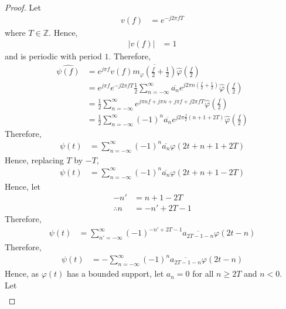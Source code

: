 \documentclass[titlepage, fleqn, a4paper, 12pt, twoside]{article}
\theoremstyle{definition}
\theoremstyle{theorem}
\begin{document}
\begin{proof}
	Let
	\begin{align*}
		v(f) &= e^{-j 2 \pi f T}
	\end{align*}
	where $T \in \mathbb{Z}$.
	Hence,
	\begin{align*}
		\left| v(f) \right| &= 1
	\end{align*}
	and is periodic with period $1$.
	Therefore,
	\begin{align*}
		\hat{\psi(f)} &= e^{j \pi f} v(f) \overline{m_{\varphi}\left( \frac{f}{2} + \frac{1}{2} \right)} \hat{\varphi}\left( \frac{f}{2} \right)\\
		&= e^{j \pi f} e^{-j 2 \pi f T} \frac{1}{2} \sum\limits_{n = -\infty}^{\infty} \overline{a_n} e^{j 2 \pi n \left( \frac{f}{2} + \frac{1}{2} \right)} \hat{\varphi}\left( \frac{f}{2} \right)\\
		&= \frac{1}{2} \sum\limits_{n = -\infty}^{\infty} e^{j \pi n f + j \pi n + j \pi f + j 2 \pi f T} \hat{\varphi}\left( \frac{f}{2} \right)\\
		&= \frac{1}{2} \sum\limits_{n = -\infty}^{\infty} (-1)^n \overline{a_n} e^{j 2 \pi \frac{f}{2} (n + 1 + 2 T)} \hat{\varphi}\left( \frac{f}{2} \right)
	\end{align*}
	Therefore,
	\begin{align*}
		\psi(t) &= \sum\limits_{n = -\infty}^{\infty} (-1)^n \overline{a_n} \varphi(2 t + n + 1 + 2 T)
	\end{align*}
	Hence, replacing $T$ by $-T$,
	\begin{align*}
		\psi(t) &= \sum\limits_{n = -\infty}^{\infty} (-1)^n \overline{a_n} \varphi(2 t + n + 1 - 2 T)
	\end{align*}
	Hence, let
	\begin{align*}
		-n' &= n + 1 - 2 T\\
		\therefore n &= -n' + 2 T - 1
	\end{align*}
	Therefore,
	\begin{align*}
		\psi(t) &= \sum\limits_{n' = -\infty}^{\infty} (-1)^{-n' + 2 T - 1} \overline{a_{2 T - 1 - n}} \varphi(2 t - n)
	\end{align*}
	Therefore,
	\begin{align*}
		\psi(t) &= -\sum\limits_{n = -\infty}^{\infty} (-1)^n \overline{a_{2 T - 1 - n}} \varphi(2 t - n)
	\end{align*}
	Hence, as $\varphi(t)$ has a bounded support, let $a_n = 0$ for all $n \ge 2 T$ and $n < 0$.\\
	Let
	\begin{align*}

\end{align*}
\end{proof}
\end{document}
